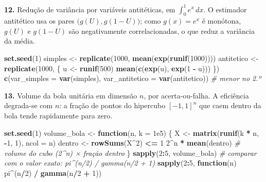 \documentclass[
  portuguese,
  11pt,
  openany]{book}
\newenvironment{Shaded}{\begin{snugshade}}{\end{snugshade}}
\newcommand{\AttributeTok}[1]{\textcolor[rgb]{0.13,0.29,0.53}{#1}}
\newcommand{\CommentTok}[1]{\textcolor[rgb]{0.56,0.35,0.01}{\textit{#1}}}
\newcommand{\ControlFlowTok}[1]{\textcolor[rgb]{0.13,0.29,0.53}{\textbf{#1}}}
\newcommand{\DecValTok}[1]{\textcolor[rgb]{0.00,0.00,0.81}{#1}}
\newcommand{\FloatTok}[1]{\textcolor[rgb]{0.00,0.00,0.81}{#1}}
\newcommand{\FunctionTok}[1]{\textcolor[rgb]{0.13,0.29,0.53}{\textbf{#1}}}
\newcommand{\NormalTok}[1]{#1}
\newcommand{\OtherTok}[1]{\textcolor[rgb]{0.56,0.35,0.01}{#1}}
\newcommand{\SpecialCharTok}[1]{\textcolor[rgb]{0.81,0.36,0.00}{\textbf{#1}}}
\begin{document}
\textbf{12.} Redução de variância por variáveis antitéticas, em \(\int_0^1 e^x\,dx\). O
estimador antitético usa os pares \(\big(g(U), g(1-U)\big)\); como \(g(x) = e^x\) é
monótona, \(g(U)\) e \(g(1-U)\) são negativamente correlacionadas, o que reduz a
variância da média.

\begin{Shaded}
\begin{Highlighting}[]
\FunctionTok{set.seed}\NormalTok{(}\DecValTok{1}\NormalTok{)}
\NormalTok{simples    }\OtherTok{\textless{}{-}} \FunctionTok{replicate}\NormalTok{(}\DecValTok{1000}\NormalTok{, }\FunctionTok{mean}\NormalTok{(}\FunctionTok{exp}\NormalTok{(}\FunctionTok{runif}\NormalTok{(}\DecValTok{1000}\NormalTok{))))}
\NormalTok{antitetico }\OtherTok{\textless{}{-}} \FunctionTok{replicate}\NormalTok{(}\DecValTok{1000}\NormalTok{, \{ u }\OtherTok{\textless{}{-}} \FunctionTok{runif}\NormalTok{(}\DecValTok{500}\NormalTok{)}
                                \FunctionTok{mean}\NormalTok{(}\FunctionTok{c}\NormalTok{(}\FunctionTok{exp}\NormalTok{(u), }\FunctionTok{exp}\NormalTok{(}\DecValTok{1} \SpecialCharTok{{-}}\NormalTok{ u))) \})}
\FunctionTok{c}\NormalTok{(}\AttributeTok{var\_simples =} \FunctionTok{var}\NormalTok{(simples), }\AttributeTok{var\_antitetico =} \FunctionTok{var}\NormalTok{(antitetico))  }\CommentTok{\# menor no 2.º}
\end{Highlighting}
\end{Shaded}

\textbf{13.} Volume da bola unitária em dimensão \(n\), por acerta-ou-falha. A eficiência
degrada-se com \(n\): a fração de pontos do hipercubo \([-1,1]^n\) que caem dentro da
bola tende rapidamente para zero.

\begin{Shaded}
\begin{Highlighting}[]
\FunctionTok{set.seed}\NormalTok{(}\DecValTok{1}\NormalTok{)}
\NormalTok{volume\_bola }\OtherTok{\textless{}{-}} \ControlFlowTok{function}\NormalTok{(n, }\AttributeTok{k =} \FloatTok{1e5}\NormalTok{) \{}
\NormalTok{  X }\OtherTok{\textless{}{-}} \FunctionTok{matrix}\NormalTok{(}\FunctionTok{runif}\NormalTok{(k }\SpecialCharTok{*}\NormalTok{ n, }\SpecialCharTok{{-}}\DecValTok{1}\NormalTok{, }\DecValTok{1}\NormalTok{), }\AttributeTok{ncol =}\NormalTok{ n)}
\NormalTok{  dentro }\OtherTok{\textless{}{-}} \FunctionTok{rowSums}\NormalTok{(X}\SpecialCharTok{\^{}}\DecValTok{2}\NormalTok{) }\SpecialCharTok{\textless{}=} \DecValTok{1}
  \DecValTok{2}\SpecialCharTok{\^{}}\NormalTok{n }\SpecialCharTok{*} \FunctionTok{mean}\NormalTok{(dentro)                       }\CommentTok{\# volume do cubo (2\^{}n) × fração dentro}
\NormalTok{\}}
\FunctionTok{sapply}\NormalTok{(}\DecValTok{2}\SpecialCharTok{:}\DecValTok{5}\NormalTok{, volume\_bola)}
\CommentTok{\# comparar com o valor exato: pi\^{}(n/2) / gamma(n/2 + 1)}
\FunctionTok{sapply}\NormalTok{(}\DecValTok{2}\SpecialCharTok{:}\DecValTok{5}\NormalTok{, }\ControlFlowTok{function}\NormalTok{(n) pi}\SpecialCharTok{\^{}}\NormalTok{(n}\SpecialCharTok{/}\DecValTok{2}\NormalTok{) }\SpecialCharTok{/} \FunctionTok{gamma}\NormalTok{(n}\SpecialCharTok{/}\DecValTok{2} \SpecialCharTok{+} \DecValTok{1}\NormalTok{))}
\end{Highlighting}
\end{Shaded}
\end{document}
